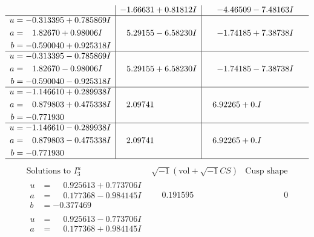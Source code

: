 \documentclass[1p]{elsarticle_modified}
\theoremstyle{definition}
\newcommand{\I}{\sqrt{-1}}
\begin{document}
$$\begin{array}{c|c|c}
 & -1.66631 + 0.81812 I & -4.46509 - 7.48163 I \\ \hline\begin{aligned}
u &= -0.313395 + 0.785869 I \\
a &= \phantom{-}1.82670 + 0.98006 I \\
b &= -0.590040 + 0.925318 I\end{aligned}
 & \phantom{-}5.29155 - 6.58230 I & -1.74185 + 7.38738 I \\ \hline\begin{aligned}
u &= -0.313395 - 0.785869 I \\
a &= \phantom{-}1.82670 - 0.98006 I \\
b &= -0.590040 - 0.925318 I\end{aligned}
 & \phantom{-}5.29155 + 6.58230 I & -1.74185 - 7.38738 I \\ \hline\begin{aligned}
u &= -1.146610 + 0.289938 I \\
a &= \phantom{-}0.879803 + 0.475338 I \\
b &= -0.771930\phantom{ +0.000000I}\end{aligned}
 & \phantom{-}2.09741\phantom{ +0.000000I} & \phantom{-}6.92265 + 0. I\phantom{ +0.000000I} \\ \hline\begin{aligned}
u &= -1.146610 - 0.289938 I \\
a &= \phantom{-}0.879803 - 0.475338 I \\
b &= -0.771930\phantom{ +0.000000I}\end{aligned}
 & \phantom{-}2.09741\phantom{ +0.000000I} & \phantom{-}6.92265 + 0. I\phantom{ +0.000000I}\\
 \hline 
 \end{array}$$\newpage$$\begin{array}{c|c|c}  
\text{Solutions to }I^u_{3}& \I (\text{vol} + \sqrt{-1}CS) & \text{Cusp shape}\\
 \hline 
\begin{aligned}
u &= \phantom{-}0.925613 + 0.773706 I \\
a &= \phantom{-}0.177368 - 0.984145 I \\
b &= -0.377469\phantom{ +0.000000I}\end{aligned}
 & \phantom{-}0.191595\phantom{ +0.000000I} & \phantom{-0.000000 } 0 \\ \hline\begin{aligned}
u &= \phantom{-}0.925613 - 0.773706 I \\
a &= \phantom{-}0.177368 + 0.984145 I \\

\end{aligned}
\end{array}$$
\end{document}
